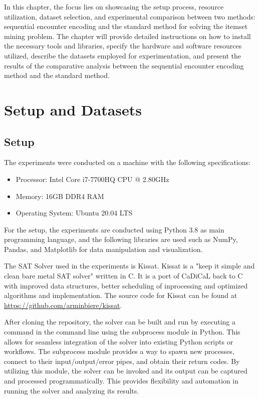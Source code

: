 In this chapter, the focus lies on showcasing the setup process, resource utilization, dataset selection,
and experimental comparison between two methods: sequential encounter encoding and the standard method for solving the itemset mining problem.
The chapter will provide detailed instructions on how to install the necessary tools and libraries, specify the hardware and software resources utilized,
describe the datasets employed for experimentation, and present the results of the comparative analysis between the sequential encounter encoding method and the standard method.
\section{Setup and Datasets}
\subsection{Setup}

The experiments were conducted on a machine with the following specifications:
\begin{itemize}
    \item Processor: Intel Core i7-7700HQ CPU @ 2.80GHz
    \item Memory: 16GB DDR4 RAM
    \item Operating System: Ubuntu 20.04 LTS
\end{itemize}

For the setup, the experiments are conducted using Python 3.8 as main programming language,
and the following libraries are used such as NumPy, Pandas, and Matplotlib for data manipulation and visualization.

The SAT Solver used in the experiments is Kissat.
Kissat is a "keep it simple and clean bare metal SAT solver"
written in C. It is a port of CaDiCaL back to C with improved data structures,
better scheduling of inprocessing and optimized algorithms and implementation.
The source code for Kissat can be found at \url{https://github.com/arminbiere/kissat}.

After cloning the repository, the solver can be built and run by executing a command in the command line using the subprocess module in Python.
This allows for seamless integration of the solver into existing Python scripts or workflows.
The subprocess module provides a way to spawn new processes, connect to their input/output/error pipes, and obtain their return codes.
By utilizing this module, the solver can be invoked and its output can be captured and processed programmatically.
This provides flexibility and automation in running the solver and analyzing its results.

